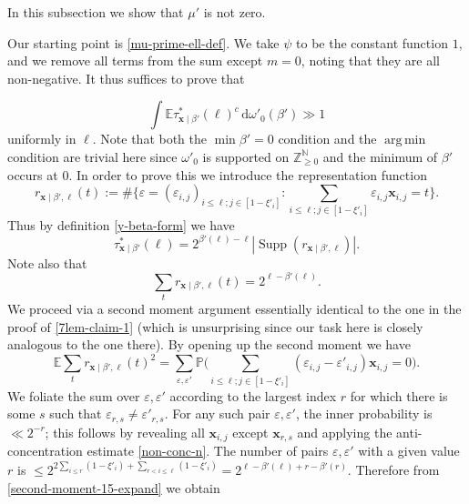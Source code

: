 \documentclass[11pt,reqno]{amsart}
\DeclareMathOperator*{\argmin}{arg\,min}
\numberwithin{equation}{section}
\theoremstyle{definition}
\theoremstyle{remark}
\newcommand{\mb}{\mathbb}
\newcommand{\mbf}{\mathbf}
\newcommand{\eps}{\varepsilon}
\newcommand\Supp{\operatorname{Supp}}
\renewcommand{\le}{\leqslant}
\renewcommand{\ge}{\geqslant}
\newcommand\Z{\mathbb{Z}}
\newcommand\N{\mathbb{N}}
\begin{document}
In this subsection we show that $\mu'$ is not zero.


Our starting point is \cref{mu-prime-ell-def}. We take $\psi$ to be the constant function $1$, and we remove all terms from the sum except $m = 0$, noting that they are all non-negative. It thus suffices to prove that

\begin{equation}\label{suff-mu-prime-pos} \int \mb{E} \tau^*_{\mbf{x} \mid \beta'}(\ell)^c \, \mathrm{d}\omega'_0(\beta') \gg 1\end{equation} uniformly in $\ell$. Note that both the $\min \beta' = 0$ condition and the $\argmin$ condition are trivial here since $\omega'_0$ is supported on $\Z_{\ge 0}^{\N}$ and the minimum of $\beta'$ occurs at $0$. In order to prove this we introduce the representation function 
\begin{equation*} r_{\mbf{x} \mid \beta', \ell}(t) := \# \{ \eps  = (\eps_{i,j})_{i \le \ell; j \in [1 - \xi'_i]}: \sum_{i \le \ell; j \in [1 - \xi'_i]} \eps_{i,j} \mbf{x}_{i,j} = t\}.\end{equation*} Thus by definition \cref{y-beta-form} we have
\begin{equation}\label{15-4-1} \tau^*_{\mbf{x} \mid \beta'}(\ell) = 2^{\beta'(\ell) - \ell} | \Supp(r_{\mbf{x} \mid \beta',\ell})|.\end{equation}
Note also that 
\begin{equation}\label{first-moment-15} \sum_t r_{\mbf{x} \mid \beta',\ell}(t) = 2^{\ell - \beta'(\ell)}.\end{equation}
We proceed via a second moment argument essentially identical to the one in the proof of \cref{7lem-claim-1} (which is unsurprising since our task here is closely analogous to the one there). By opening up the second moment we have
\begin{equation}\label{second-moment-15-expand} \mb{E} \sum_t r_{\mbf{x} \mid \beta',\ell}(t)^2 = \sum_{\eps,\eps'} \mb{P}\big( \sum_{i \le \ell;j \in [1 - \xi'_i]} (\eps_{i,j} - \eps'_{i,j}) \mbf{x}_{i,j} = 0 \big).\end{equation}
We foliate the sum over $\eps, \eps'$ according to the largest index $r$ for which there is some $s$ such that $\eps_{r,s} \neq \eps'_{r,s}$. For any such pair $\eps, \eps'$, the inner probability is $\ll 2^{-r}$; this follows by revealing all $\mbf{x}_{i,j}$ except $\mbf{x}_{r,s}$ and applying the anti-concentration estimate \cref{non-conc-n}.  The number of pairs $\eps, \eps'$ with a given value $r$ is $\le 2^{2\sum_{i \le r} (1 - \xi'_i) + \sum_{r < i \le \ell} (1 - \xi'_i)} = 2^{\ell - \beta'(\ell) + r - \beta'(r)}$. Therefore from \cref{second-moment-15-expand} we obtain
\end{document}
